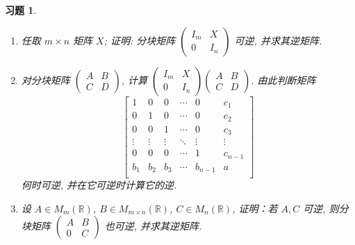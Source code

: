 \documentclass[UTF8]{ctexart}
\newtheorem{ex}[thm]{习题}
\begin{document}
\begin{ex}\label{ex-14}
	\begin{enumerate}
		\item 任取 $m \times n$ 矩阵 $X$; 证明: 分块矩阵
		$\left( \begin{array}{cc}
		I_m & X \\
		0 & I_n
		\end{array} \right)$
		可逆, 并求其逆矩阵.
		\item 对分块矩阵 $\left( \begin{array}{cc}
		A & B \\
		C & D
		\end{array} \right)$, 计算 $\left( \begin{array}{cc}
		I_m & X \\
		0 & I_n
		\end{array} \right)\left( \begin{array}{cc}
		A & B \\
		C & D
		\end{array} \right)$. 由此判断矩阵
		$$	\begin{bmatrix}
		1& 0& 0&\cdots&0&c_1\\
		0& 1& 0&\cdots&0&c_2\\
		0& 0& 1&\cdots&0&c_3\\
		\vdots& \vdots& \vdots&\ddots&\vdots&\vdots\\
		0 & 0 & 0 & \cdots & 1 & c_{n-1}\\
		b_1& b_2& b_3&\cdots& b_{n-1}&a\\
		\end{bmatrix}$$ 何时可逆, 并在它可逆时计算它的逆.
		\item 设 $A \in M_m(\mathbb R)$, $B \in M_{m \times n}(\mathbb R)$,
		$C \in M_n(\mathbb R)$,	证明：若 $A, C$ 可逆,	则分块矩阵
		$\left( \begin{array}{cc}
		A & B \\
		0 & C
		\end{array} \right)$
		也可逆, 并求其逆矩阵.
	\end{enumerate}
\end{ex}
\end{document}
